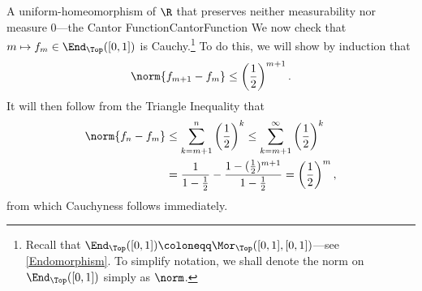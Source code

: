 \begin{exm}{A uniform-homeomorphism of $\R$ that preserves neither measurability nor measure $0$---the Cantor Function}{CantorFunction}
We now check that $m\mapsto f_m\in \End _{\Top}([0,1])$ is Cauchy.\footnote{Recall that $\End _{\Top}([0,1])\coloneqq \Mor _{\Top}([0,1],[0,1])$---see \cref{Endomorphism}.  To simplify notation, we shall denote the norm on $\End _{\Top}([0,1])$ simply as $\norm$.} To do this, we will show by induction that
\begin{equation}\label{5.2.28}
\norm{f_{m+1}-f_m}\leq \left( \frac{1}{2}\right) ^{m+1}.
\end{equation}
It will then follow from the Triangle Inequality that
\begin{equation}
\begin{split}
\norm{f_n-f_m} & \leq \sum _{k=m+1}^n\left( \frac{1}{2}\right) ^k\leq \sum _{k=m+1}^\infty \left( \frac{1}{2}\right) ^k \\
& =\frac{1}{1-\tfrac{1}{2}}-\frac{1-(\tfrac{1}{2})^{m+1}}{1-\tfrac{1}{2}}=\left( \frac{1}{2}\right) ^m,
\end{split}
\end{equation}
from which Cauchyness follows immediately.


\end{exm}
